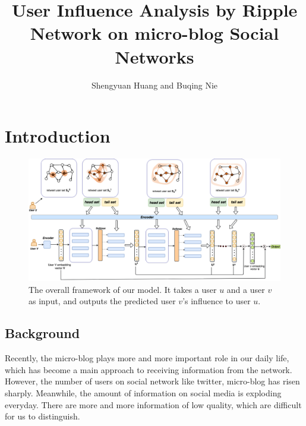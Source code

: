 \documentclass{acmtog} %
\begin{document}

\title{User Influence Analysis by Ripple Network on micro-blog Social Networks } %

\author{Shengyuan Huang {\upshape and} Buqing Nie
}


\maketitle


\section{Introduction}

\begin{figure}
\centering
\includegraphics[width=14cm]{model.png}
\caption{The overall framework of our model. It takes a user $u$ and a user $v$ as input, and outputs the predicted user $v$'s influence to user $u$.}
\end{figure}

\subsection{Background}
Recently, the micro-blog plays more and more important role in our daily life, which has become a main approach to receiving information from the network. However, the number of users on social network like twitter, micro-blog has risen sharply. Meanwhile, the amount of information on social media is exploding everyday. There are more and more information of low quality, which are difficult for us to distinguish.
\end{document}
